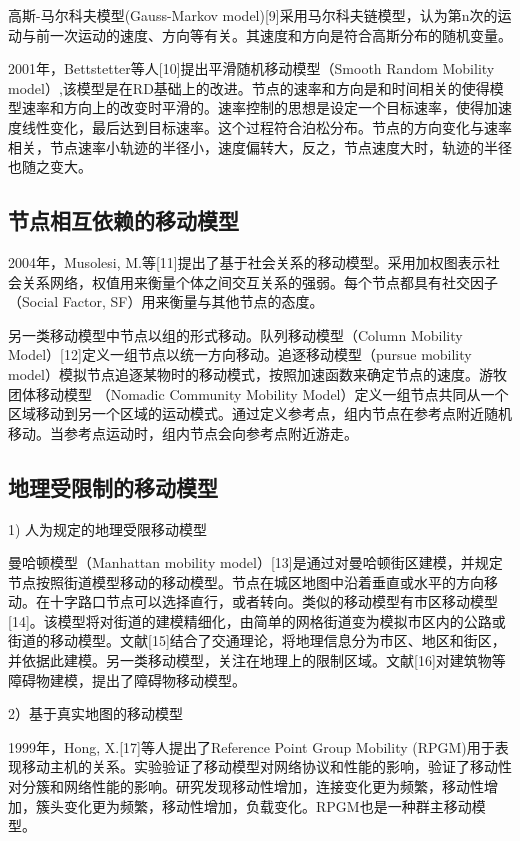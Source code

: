	高斯-马尔科夫模型(Gauss-Markov model)[9]采用马尔科夫链模型，认为第n次的运动与前一次运动的速度、方向等有关。其速度和方向是符合高斯分布的随机变量。

2001年，Bettstetter等人[10]提出平滑随机移动模型（Smooth Random Mobility model）,该模型是在RD基础上的改进。节点的速率和方向是和时间相关的使得模型速率和方向上的改变时平滑的。速率控制的思想是设定一个目标速率，使得加速度线性变化，最后达到目标速率。这个过程符合泊松分布。节点的方向变化与速率相关，节点速率小轨迹的半径小，速度偏转大，反之，节点速度大时，轨迹的半径也随之变大。

\subsection{节点相互依赖的移动模型}
2004年，Musolesi, M.等[11]提出了基于社会关系的移动模型。采用加权图表示社会关系网络，权值用来衡量个体之间交互关系的强弱。每个节点都具有社交因子（Social Factor, SF）用来衡量与其他节点的态度。

另一类移动模型中节点以组的形式移动。队列移动模型（Column Mobility Model）[12]定义一组节点以统一方向移动。追逐移动模型（pursue mobility model）模拟节点追逐某物时的移动模式，按照加速函数来确定节点的速度。游牧团体移动模型
（Nomadic Community Mobility Model）定义一组节点共同从一个区域移动到另一个区域的运动模式。通过定义参考点，组内节点在参考点附近随机移动。当参考点运动时，组内节点会向参考点附近游走。

\subsection{地理受限制的移动模型}

  1) 人为规定的地理受限移动模型

曼哈顿模型（Manhattan mobility model）[13]是通过对曼哈顿街区建模，并规定节点按照街道模型移动的移动模型。节点在城区地图中沿着垂直或水平的方向移动。在十字路口节点可以选择直行，或者转向。类似的移动模型有市区移动模型[14]。该模型将对街道的建模精细化，由简单的网格街道变为模拟市区内的公路或街道的移动模型。文献[15]结合了交通理论，将地理信息分为市区、地区和街区，并依据此建模。另一类移动模型，关注在地理上的限制区域。文献[16]对建筑物等障碍物建模，提出了障碍物移动模型。
 
 2）基于真实地图的移动模型
 
 1999年，Hong, X.[17]等人提出了Reference Point Group Mobility (RPGM)用于表现移动主机的关系。实验验证了移动模型对网络协议和性能的影响，验证了移动性对分簇和网络性能的影响。研究发现移动性增加，连接变化更为频繁，移动性增加，簇头变化更为频繁，移动性增加，负载变化。RPGM也是一种群主移动模型。


